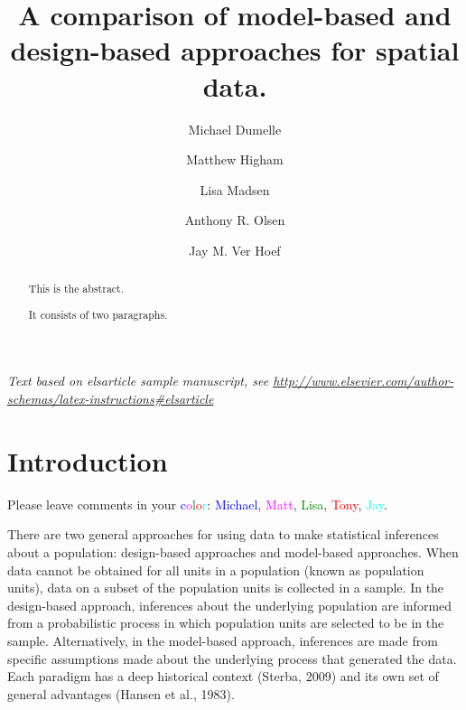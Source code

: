 \documentclass[]{elsarticle} %
\begin{document}
\begin{frontmatter}

  \title{A comparison of model-based and design-based approaches for
spatial data.}
    \author[USEPA]{Michael Dumelle}
    \author[STLAW]{Matthew Higham}
    \author[OSU]{Lisa Madsen}
  
    \author[USEPA]{Anthony R. Olsen}
  
    \author[NOAA]{Jay M. Ver Hoef}
  
      \address[USEPA]{United States Environmental Protection Agency, 200
SW 35th St, Corvallis, Oregon, 97333}
    \address[STLAW]{Saint Lawrence University Department of Math,
Computer Science, and Statistics, 23 Romoda Drive, Canton, New York,
13617}
    \address[OSU]{Oregon State University Department of Statistics, 239
Weniger Hall, Corvallis, Oregon, 97331}
    \address[NOAA]{Marine Mammal Laboratory, Alaska Fisheries Science
Center, National Oceanic and Atmospheric Administration, Seattle,
Washington, 98115}
  
  \begin{abstract}
  This is the abstract.

  It consists of two paragraphs.
  \end{abstract}
  
 \end{frontmatter}

\emph{Text based on elsarticle sample manuscript, see
\url{http://www.elsevier.com/author-schemas/latex-instructions\#elsarticle}}

\hypertarget{sec:introduction}{%
\section{Introduction}\label{sec:introduction}}

Please leave comments in your
\textcolor{blue}{c}\textcolor{magenta}{o}\textcolor{green}{l}\textcolor{red}{o}\textcolor{cyan}{r}:
\textcolor{blue}{Michael}, \textcolor{magenta}{Matt},
\textcolor{green}{Lisa}, \textcolor{red}{Tony}, \textcolor{cyan}{Jay}.

There are two general approaches for using data to make statistical
inferences about a population: design-based approaches and model-based
approaches. When data cannot be obtained for all units in a population
(known as population units), data on a subset of the population units is
collected in a sample. In the design-based approach, inferences about
the underlying population are informed from a probabilistic process in
which population units are selected to be in the sample. Alternatively,
in the model-based approach, inferences are made from specific
assumptions made about the underlying process that generated the data.
Each paradigm has a deep historical context (Sterba, 2009) and its own
set of general advantages (Hansen et al., 1983).
\end{document}
